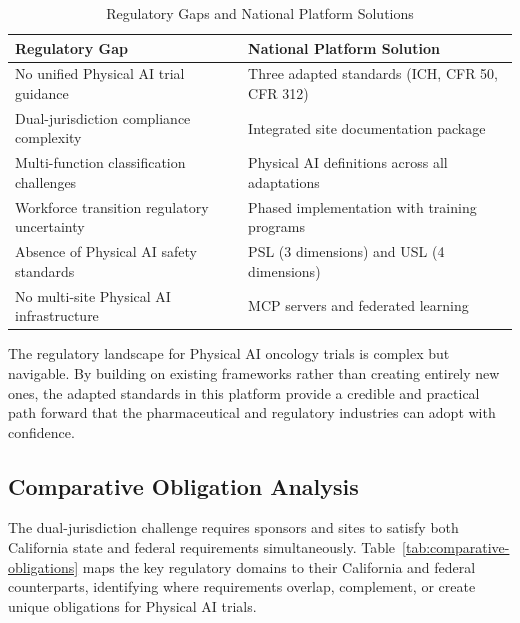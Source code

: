 \begin{table}[H]
\centering
\caption{Regulatory Gaps and National Platform Solutions}
\label{tab:gaps-solutions}
\small
\begin{tabularx}{\textwidth}{X X}
\toprule
\textbf{Regulatory Gap} & \textbf{National Platform Solution} \\
\midrule
No unified Physical AI trial guidance & Three adapted standards (ICH, CFR 50, CFR 312) \\
Dual-jurisdiction compliance complexity & Integrated site documentation package \\
Multi-function classification challenges & Physical AI definitions across all adaptations \\
Workforce transition regulatory uncertainty & Phased implementation with training programs \\
Absence of Physical AI safety standards & PSL (3 dimensions) and USL (4 dimensions) \\
No multi-site Physical AI infrastructure & MCP servers and federated learning \\
\bottomrule
\end{tabularx}
\end{table}

The regulatory landscape for Physical AI oncology trials is complex but
navigable. By building on existing frameworks rather than creating entirely new
ones, the adapted standards in this platform \cite{ich-adapt, cfr50-adapt,
cfr312-adapt} provide a credible and practical path forward that the
pharmaceutical and regulatory industries can adopt with confidence.

\subsection{Comparative Obligation Analysis}
\label{subsec:comparative-obligations}

The dual-jurisdiction challenge requires sponsors and sites to satisfy both
California state and federal requirements simultaneously. Table~\ref{tab:comparative-obligations}
maps the key regulatory domains to their California and federal counterparts,
identifying where requirements overlap, complement, or create unique obligations
for Physical AI trials.

